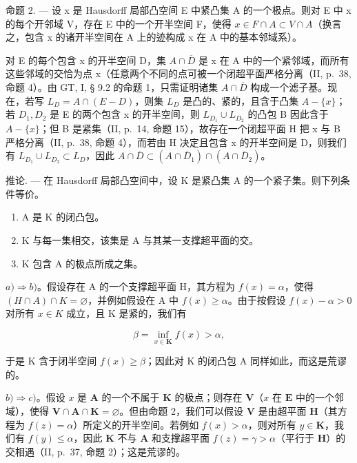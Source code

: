 命题 2. --- 设 x 是 Hausdorff 局部凸空间 E 中紧凸集 A 的一个极点。则对 E 中 x 的每个开邻域 V，存在 E 中的一个开半空间 F，使得 \(x \in F \cap A \subset V \cap A\)（换言之，包含 x 的诸开半空间在 A 上的迹构成 x 在 A 中的基本邻域系）。

对 E 的每个包含 x 的开半空间 D，集 \(A \cap \overline{D}\) 是 x 在 A 中的一个紧邻域，而所有这些邻域的交恰为点 x（任意两个不同的点可被一个闭超平面严格分离（II, p.~38, 命题 4）。由 GT, I, § 9.2 的命题 1，只需证明诸集 \(A \cap \overline{D}\) 构成一个滤子基。现在，若写 \(L_{D} = A \cap (E - D)\)，则集 \(L_{D}\) 是凸的、紧的，且含于凸集 \(A - \{x\}\)；若 \(D_{1}, D_{2}\) 是 E 的两个包含 x 的开半空间，则 \(L_{D_{1}} \cup L_{D_{2}}\) 的凸包 B 因此含于 \(A - \{x\}\)；但 B 是紧集（II, p.~14, 命题 15），故存在一个闭超平面 H 把 x 与 B 严格分离（II, p.~38, 命题 4），而若由 H 决定且包含 x 的开半空间是 D，则我们有 \(L_{D_{1}} \cup L_{D_{2}} \subset L_{D}\)，因此 \(A \cap \overline{D} \subset (A \cap \overline{D}_{1}) \cap (A \cap \overline{D}_{2})\)。

推论. --- 在 Hausdorff 局部凸空间中，设 K 是紧凸集 A 的一个紧子集。则下列条件等价。

\begin{enumerate}
\def\labelenumi{\alph{enumi})}
\item
  A 是 K 的闭凸包。
\item
  K 与每一集相交，该集是 A 与其某一支撑超平面的交。
\item
  K 包含 A 的极点所成之集。
\end{enumerate}

\(a) \Rightarrow b)\)。假设存在 A 的一个支撑超平面 H，其方程为 \(f(x) = \alpha\)，使得 \((H \cap A) \cap K = \varnothing\)，并例如假设在 A 中 \(f(x) \geqslant \alpha\)。由于按假设 \(f(x) - \alpha > 0\) 对所有 \(x \in K\) 成立，且 K 是紧的，我们有

\[
\beta = \inf _ {x \in \mathbf {K}} f (x) > \alpha ,
\]

于是 K 含于闭半空间 \(f(x) \geqslant \beta\)；因此对 K 的闭凸包 A 同样如此，而这是荒谬的。

\(b) \Rightarrow c)\)。假设 \(x\) 是 \(\mathbf{A}\) 的一个不属于 \(\mathbf{K}\) 的极点；则存在 \(\mathbf{V}\)（\(x\) 在 \(\mathbf{E}\) 中的一个邻域），使得 \(\mathbf{V} \cap \mathbf{A} \cap \mathbf{K} = \varnothing\)。但由命题 2，我们可以假设 \(\mathbf{V}\) 是由超平面 \(\mathbf{H}\)（其方程为 \(f(z) = \alpha\)）所定义的开半空间。若例如 \(f(x) > \alpha\)，则对所有 \(y \in \mathbf{K}\)，我们有 \(f(y) \leqslant \alpha\)，因此 \(\mathbf{K}\) 不与 \(\mathbf{A}\) 和支撑超平面 \(f(z) = \gamma > \alpha\)（平行于 \(\mathbf{H}\)）的交相遇（II, p.~37, 命题 2）；这是荒谬的。

